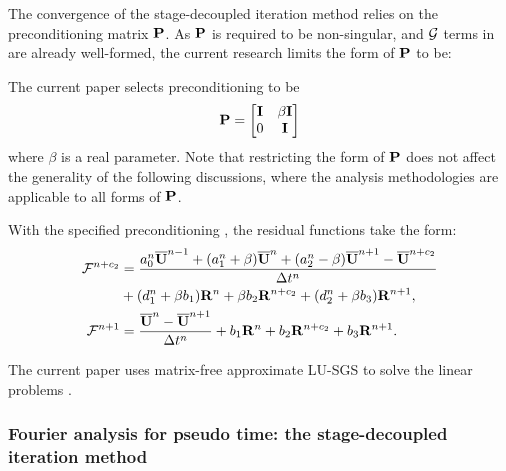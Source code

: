 The convergence of the stage-decoupled iteration method relies on
the preconditioning matrix $\mathbf{P}$.
As $\mathbf{P}$ is required to be non-singular, and
$\mathcal{G}$ terms in  are already
well-formed, the current research limits the form
of $\mathbf{P}$ to be:

The current paper selects preconditioning to be
\begin{equation}
    \mathbf{P} = \begin{bmatrix}
        \mathbf{I} & \beta\mathbf{I} \\
        0    & \mathbf{I}
    \end{bmatrix}
    \label{eq:specialP}
\end{equation}
where $\beta$ is a real parameter.
Note that restricting the form of $\mathbf{P}$ does not affect the
generality of the following discussions,
where the analysis methodologies
are applicable to all forms of $\mathbf{P}$.

With the specified preconditioning ,
the residual functions take the form:
\begin{equation}
    \begin{aligned}
        \mathcal{F}^{n+c_2} & =
        \frac{a^n_0\overline{\mathbf{U}}^{n - 1} +
            (a^n_1+\beta)\overline{\mathbf{U}}^{n} +
            (a^n_2-\beta)\overline{\mathbf{U}}^{n + 1} - \overline{\mathbf{U}}^{n+c_2}}{{\Delta} t^n}
        \\ & +
        (d^n_1 + \beta b_1)\mathbf{R}^{n} +
        \beta b_2 \mathbf{R}^{n+c_2} +
        (d^n_2 + \beta b_3)\mathbf{R}^{n + 1},                             \\
        \mathcal{F}^{n+1}   & =    \frac{\overline{\mathbf{U}}^{n} - \overline{\mathbf{U}}^{n+1}}{{\Delta} t^n}  +
        b_1 \mathbf{R}^n +
        b_2 \mathbf{R}^{n+c_2} +
        b_3 \mathbf{R}^{n+1}.
    \end{aligned}
\end{equation}

The current paper uses matrix-free approximate LU-SGS
\cite{luo1998fast,luo2001accurate} to solve the linear problems .

\subsubsection{Fourier analysis for pseudo time: the stage-decoupled iteration method}
\label{sssec:SDSFourier}

